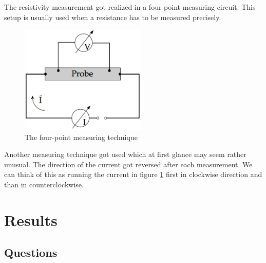 \documentclass[a4paper,parskip,11pt, DIV12]{scrreprt}
\begin{document}
The resistivity measurement got realized in a four point measuring circuit. This setup is usually used when a resistance has to be measured precisely. 

\begin{figure}[H]
\centering
\includegraphics[width=6cm]{vierpunkt.png}
\caption{The four-point measuring technique}
\label{vierpunkt}
\end{figure}


Another measuring technique got used which at first glance may seem rather unusual. The direction of the current got reversed after each measurement. We can think of this as running the current in figure \ref{vierpunkt} first in clockwise direction and than in counterclockwise.


\chapter{Results}

\section{Questions}
\end{document}
